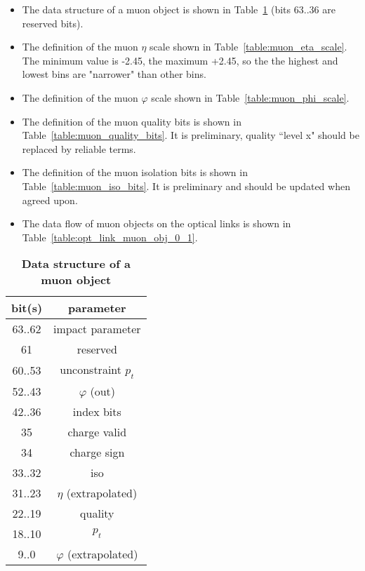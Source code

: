 \documentclass{cmspaper}
\begin{document}
\begin{itemize}
\item The data structure of a muon object is shown in Table~\ref{table:muon_object} (bits 63..36 are reserved bits).
\item The definition of the muon $\eta$ scale shown in Table~\ref{table:muon_eta_scale}. The minimum value is -2.45, the maximum +2.45, so the the highest and lowest
bins are "narrower" than other bins.
\item The definition of the muon $\varphi$ scale shown in Table~\ref{table:muon_phi_scale}.
\item The definition of the muon quality bits is shown in Table~\ref{table:muon_quality_bits}. It is preliminary, quality ``level x" should be replaced by reliable terms.
\item The definition of the muon isolation bits is shown in Table~\ref{table:muon_iso_bits}. It is preliminary and should be updated when agreed upon. 
\item The data flow of muon objects on the optical links is shown in Table~\ref{table:opt_link_muon_obj_0_1}.
\end{itemize}

\begin{table}[ht]
\caption{\bf Data structure of a muon object}
\vspace{5mm}
\centering
\begin{tabular}{|c|c|}\hline
bit(s) & parameter \\\hline\hline
63..62 & impact parameter \\
61 & reserved \\
60..53 & unconstraint $p_t$ \\
52..43 & $\varphi$ (out) \\
42..36 & index bits \\
35 & charge valid \\
34 & charge sign \\
33..32 & iso \\
31..23 & $\eta$ (extrapolated) \\
22..19 & quality \\
18..10 & $p_t$ \\
9..0 & $\varphi$ (extrapolated) \\\hline
\end{tabular}
\label{table:muon_object}
\end{table}
\end{document}
